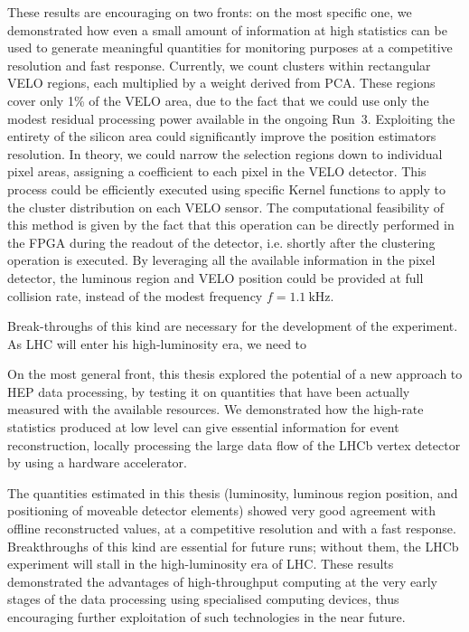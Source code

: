 These results are encouraging on two fronts: on the most specific one, we demonstrated how even a small amount of information at high statistics can be used to generate meaningful quantities for monitoring purposes at a competitive resolution and fast response. Currently, we count clusters within rectangular VELO regions, each multiplied by a weight derived from PCA. These regions cover only 1\% of the VELO area, due to the fact that we could use only the modest residual processing power available in the ongoing Run~3. Exploiting the entirety of the silicon area could significantly improve the position estimators resolution.  In theory, we could narrow the selection regions down to individual pixel areas, assigning a coefficient to each pixel in the VELO detector. This process could be efficiently executed using specific Kernel functions to apply to the cluster distribution on each VELO sensor. 
The computational feasibility of this method is given by the fact that this operation can be directly performed in the FPGA during the readout of the detector, i.e. shortly after the clustering operation is executed. By leveraging all the available information in the pixel detector, the luminous region and VELO position could be provided at full collision rate, instead of the modest frequency $f=\SI{1.1}{\kilo\hertz}$.

Break-throughs of this kind are necessary for the development of the experiment. As LHC will enter his high-luminosity era, we need to

On the most general front, this thesis explored the potential of a new approach to HEP data processing, by testing it on quantities that have been actually measured with the available resources. We demonstrated how the high-rate statistics produced at low level can give essential information for event reconstruction, locally processing the large data flow of the LHCb vertex detector by using a hardware accelerator. 

The quantities estimated in this thesis (luminosity, luminous region position, and positioning of moveable detector elements) showed very good agreement with offline reconstructed values, at a competitive resolution and with a fast response. Breakthroughs of this kind are essential for future runs; without them, the LHCb experiment will stall in the high-luminosity era of LHC.  These results demonstrated the advantages of high-throughput computing at the very early stages of the data processing using specialised computing devices, thus encouraging further exploitation of such technologies in the near future.



